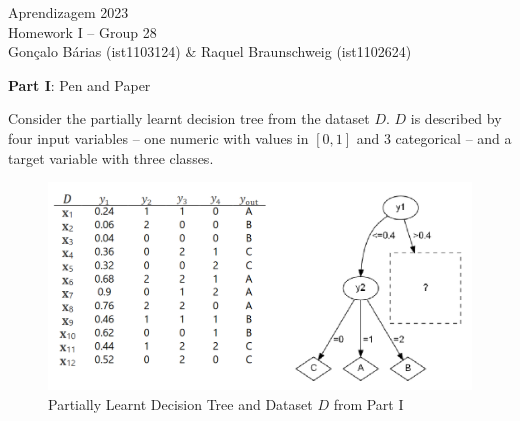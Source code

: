 \documentclass[12pt]{article}
\begin{document}
\begin{center}
\large{Aprendizagem 2023}\\
Homework I -- Group 28\\
\vskip 0.3cm
Gonçalo Bárias (ist1103124) \& Raquel Braunschweig (ist1102624)\vskip 1cm

\large{\textbf{Part I}: Pen and Paper}\normalsize
\end{center}

\noindent Consider the partially learnt decision tree from the dataset $D$. $D$ is described by four input variables –
one numeric with values in $[0,1]$ and 3 categorical – and a target variable with three classes.

\begin{figure}[H]
    \centering
    \includegraphics[width=15cm]{./assets/partial_tree_dataset_d}
    \caption{Partially Learnt Decision Tree and Dataset $D$ from Part I}
    \label{fig:PartI-partial-decision-tree-dataset-d}
\end{figure}
\end{document}
